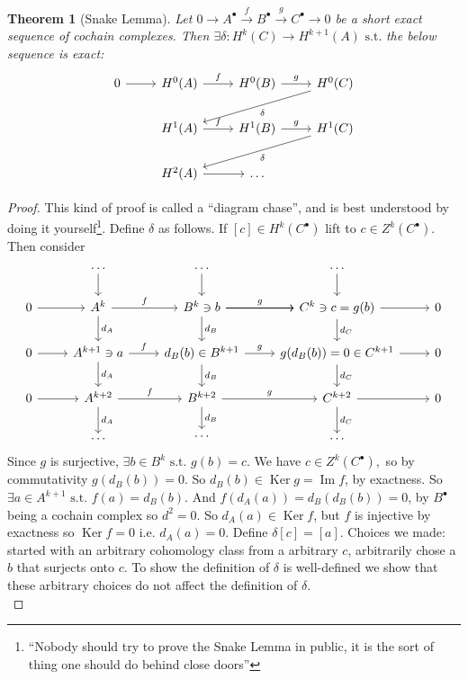 \documentclass[10pt]{article}
\theoremstyle{plain}
\newtheorem{thm}{Theorem}[section] %
\theoremstyle{definition}
\newcommand{\st}{\text{ s.t. }}
\DeclareMathOperator{\Ker}{Ker}
\DeclareMathOperator{\Ima}{Im}
\newcommand{\funcSES}[5]{0\to {#1}^\bullet \xrightarrow{#2} {#3}^\bullet \xrightarrow{#4} {#5}^\bullet \to 0}
\newcommand{\funcABCSES}{\funcSES{A}{f}{B}{g}{C}}
\newcommand{\mysection}[1]{
    \setcounter{thm}{0}
    \section*{#1}
    \addcontentsline{toc}{section}{#1}
    \addtocounter{section}{1}
    \setcounter{subsection}{0}

}
\begin{document}
\begin{thm}[Snake Lemma]\label{theorem:snakelemma}
Let $\funcABCSES$ be a short exact sequence of cochain complexes. Then $\exists\delta : H^k(C) \to H^{k+1}(A) \st$the below sequence is exact:$$
\begin{tikzcd}
0 \arrow[r] & H^0(A) \arrow[r, "f"] & H^0(B) \arrow[r, "g"] & H^0(C) \arrow[lld, "\delta"] \\
            & H^1(A) \arrow[r, "f"] & H^1(B) \arrow[r, "g"] & H^1(C) \arrow[lld, "\delta"] \\
            & H^2(A) \arrow[r]      & \dots                 &                             
\end{tikzcd}$$
\end{thm}
\begin{proof}
This kind of proof is called a ``diagram chase'', and is best understood by doing it yourself\footnote{``Nobody should try to prove the Snake Lemma in public, it is the sort of thing one should do behind close doors''}. Define $\delta$ as follows. If $[c] \in H^k(C^\bullet)$ lift to $c\in Z^k(C^\bullet)$. Then consider 
$$\begin{tikzcd}
            & \dots \arrow[d]                              & \dots \arrow[d]                                                          & \dots \arrow[d]                                   &   \\
0 \arrow[r] & A^k \arrow[r, "f"] \arrow[d, "d_A"]          & B^k\ni b \arrow[r, "g"] \arrow[d, "d_B" ] \arrow[r] \arrow[r] & C^k\ni c = g(b) \arrow[r] \arrow[d, "d_C"]        & 0 \\
0 \arrow[r] & A^{k+1}\ni a \arrow[r, "f"] \arrow[d, "d_A"] & d_B(b)\in B^{k+1} \arrow[r, "g"] \arrow[d, "d_B"]                        & g(d_B(b))=0\in C^{k+1} \arrow[r] \arrow[d, "d_C"] & 0 \\
0 \arrow[r] & A^{k+2} \arrow[r, "f"] \arrow[d, "d_A"]      & B^{k+2} \arrow[r, "g"] \arrow[d, "d_B"]                                  & C^{k+2} \arrow[r] \arrow[d, "d_C"]                & 0 \\
            & \dots                                        & \cdots                                                                   & \dots                                             &  
\end{tikzcd}$$
Since $g$ is surjective, $\exists b \in B^k \st g(b) = c.$ We have $c\in Z^k(C^\bullet),$ so by commutativity $g(d_B(b)) = 0$. So $d_B(b) \in \Ker g = \Ima f$, by exactness. So $\exists a \in A^{k+1} \st f(a) = d_B(b)$. And $f(d_A(a)) = d_B(d_B(b)) = 0$, by $B^\bullet$ being a cochain complex so $d^2 =0$. So $d_A(a) \in \Ker f$, but $f$ is injective by exactness so $\Ker f = 0$ i.e. $d_A(a) = 0$. Define $\delta [c] = [a]$. Choices we made: started with an arbitrary cohomology class from a arbitrary $c$, arbitrarily chose a $b$ that surjects onto $c$. To show the definition of $\delta$ is well-defined we show that these arbitrary choices do not affect the definition of $\delta$.\\

\end{proof}
\end{document}
